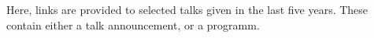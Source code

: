 \documentclass[11pt, a4paper]{russell}
\begin{document}





Here, links are provided to selected talks given in the last five years. 
These contain either a talk announcement, or a programm.




% 

% 

% 


\vspace*{\fill}
\end{document}
